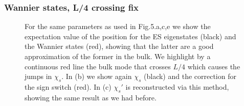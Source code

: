 \documentclass[twocolumn,amsmath,longbibliography,amssymb,superscriptaddress]{revtex4-1}
\begin{document}
\subsubsection{Wannier states, L/4 crossing fix}


\begin{figure}[t]
\centering
{}\hspace{0mm}


\caption{For the same parameters as used in Fig.5.a,c,e we show the expectation value of the position for the ES eigenstates (black) and the Wannier states (red), showing that the latter are a good approximation of the former in the bulk. We highlight by a continuous red line the bulk mode that crosses $L/4$ which causes the jumps in $\chi_s$. In (b) we show again $\chi_s$ (black) and the correction for the sign switch (red). In (c) $\chi_s'$ is reconstructed via this method, showing the same result as we had before.}
\label{wan}
\end{figure}
\end{document}
